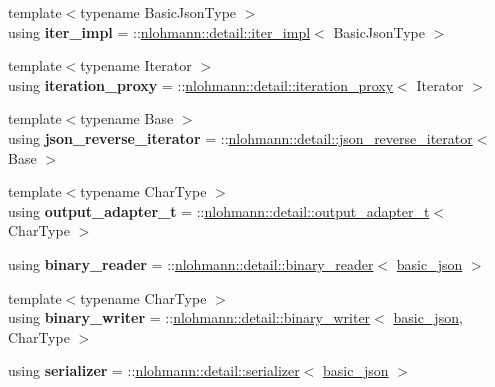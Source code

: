 \begin{DoxyCompactItemize}
{\footnotesize template$<$typename Basic\+Json\+Type $>$ }\\using {\bfseries iter\+\_\+impl} = \+::\mbox{\hyperlink{classnlohmann_1_1detail_1_1iter__impl}{nlohmann\+::detail\+::iter\+\_\+impl}}$<$ Basic\+Json\+Type $>$
\item 
\mbox{\label{classnlohmann_1_1basic__json_afb49d897bc58d6678f4471925bbfbb01}} 
{\footnotesize template$<$typename Iterator $>$ }\\using {\bfseries iteration\+\_\+proxy} = \+::\mbox{\hyperlink{classnlohmann_1_1detail_1_1iteration__proxy}{nlohmann\+::detail\+::iteration\+\_\+proxy}}$<$ Iterator $>$
\item 
\mbox{\label{classnlohmann_1_1basic__json_a8d18136ac63e52780e9d7441981a2db4}} 
{\footnotesize template$<$typename Base $>$ }\\using {\bfseries json\+\_\+reverse\+\_\+iterator} = \+::\mbox{\hyperlink{classnlohmann_1_1detail_1_1json__reverse__iterator}{nlohmann\+::detail\+::json\+\_\+reverse\+\_\+iterator}}$<$ Base $>$
\item 
\mbox{\label{classnlohmann_1_1basic__json_a5f17a041e3338ea006eaac2d89446c0d}} 
{\footnotesize template$<$typename Char\+Type $>$ }\\using {\bfseries output\+\_\+adapter\+\_\+t} = \+::\mbox{\hyperlink{namespacenlohmann_1_1detail_a9b680ddfb58f27eb53a67229447fc556}{nlohmann\+::detail\+::output\+\_\+adapter\+\_\+t}}$<$ Char\+Type $>$
\item 
\mbox{\label{classnlohmann_1_1basic__json_a7e06ed27ff517575ccb23fc23fca2b8f}} 
using {\bfseries binary\+\_\+reader} = \+::\mbox{\hyperlink{classnlohmann_1_1detail_1_1binary__reader}{nlohmann\+::detail\+::binary\+\_\+reader}}$<$ \mbox{\hyperlink{classnlohmann_1_1basic__json}{basic\+\_\+json}} $>$
\item 
\mbox{\label{classnlohmann_1_1basic__json_af32e8be561b513f946e3ca511e968d58}} 
{\footnotesize template$<$typename Char\+Type $>$ }\\using {\bfseries binary\+\_\+writer} = \+::\mbox{\hyperlink{classnlohmann_1_1detail_1_1binary__writer}{nlohmann\+::detail\+::binary\+\_\+writer}}$<$ \mbox{\hyperlink{classnlohmann_1_1basic__json}{basic\+\_\+json}}, Char\+Type $>$
\item 
\mbox{\label{classnlohmann_1_1basic__json_a68557c31b3bdf31c12e148baecec0d23}} 
using {\bfseries serializer} = \+::\mbox{\hyperlink{classnlohmann_1_1detail_1_1serializer}{nlohmann\+::detail\+::serializer}}$<$ \mbox{\hyperlink{classnlohmann_1_1basic__json}{basic\+\_\+json}} $>$
\end{DoxyCompactItemize}
